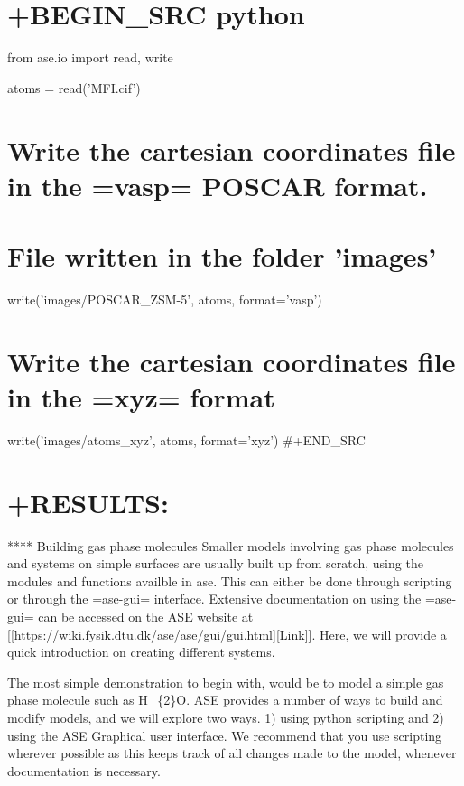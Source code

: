 \documentclass[11pt]{article}
\begin{document}
\section{+BEGIN\_SRC python}\label{begin_src-python-1}

from ase.io import read, write

atoms = read('MFI.cif')

\section{Write the cartesian coordinates file in the =vasp= POSCAR
format.}\label{write-the-cartesian-coordinates-file-in-the-vasp-poscar-format.}

\section{File written in the folder
'images'}\label{file-written-in-the-folder-images}

write('images/POSCAR\_ZSM-5', atoms, format='vasp')

\section{Write the cartesian coordinates file in the =xyz=
format}\label{write-the-cartesian-coordinates-file-in-the-xyz-format}

write('images/atoms\_xyz', atoms, format='xyz') \#+END\_SRC

\section{+RESULTS:}\label{results-11}

**** Building gas phase molecules Smaller models involving gas phase
molecules and systems on simple surfaces are usually built up from
scratch, using the modules and functions availble in ase. This can
either be done through scripting or through the =ase-gui= interface.
Extensive documentation on using the =ase-gui= can be accessed on the
ASE website at
{[}{[}https://wiki.fysik.dtu.dk/ase/ase/gui/gui.html{]}{[}Link{]}{]}.
Here, we will provide a quick introduction on creating different
systems.

The most simple demonstration to begin with, would be to model a simple
gas phase molecule such as H\_\{2\}O. ASE provides a number of ways to
build and modify models, and we will explore two ways. 1) using python
scripting and 2) using the ASE Graphical user interface. We recommend
that you use scripting wherever possible as this keeps track of all
changes made to the model, whenever documentation is necessary.
\end{document}
